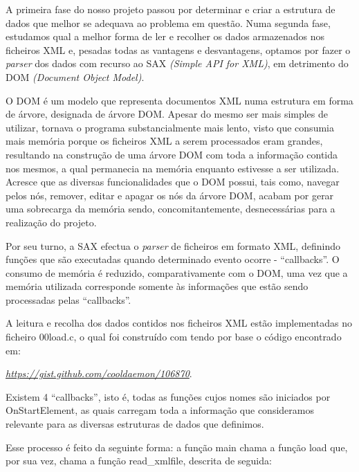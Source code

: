\documentclass[a4paper]{report}
\begin{document}
A primeira fase do nosso projeto passou por determinar e criar a estrutura de dados
que melhor se adequava ao problema em questão.
Numa segunda fase, estudamos qual a melhor forma de ler e recolher os dados armazenados
nos ficheiros XML e, pesadas todas as vantagens e desvantagens, optamos por fazer o
\textit{parser} dos dados com recurso ao SAX \textit{(Simple API for XML)},
em detrimento do DOM \textit{(Document Object Model)}. \par
O DOM é um modelo que representa documentos XML numa estrutura
em forma de árvore, designada de árvore DOM. Apesar do mesmo ser mais simples de utilizar,
tornava o programa substancialmente mais lento, visto que consumia mais memória porque os ficheiros
XML a serem processados eram grandes, resultando na construção de uma árvore DOM com toda a informação
contida nos mesmos, a qual permanecia na memória enquanto estivesse a ser utilizada. Acresce que
as diversas funcionalidades que o DOM possui, tais como, navegar pelos nós, remover, editar e apagar
os nós da árvore DOM, acabam por gerar uma sobrecarga da memória sendo, concomitantemente,
desnecessárias para a realização do projeto. \par
Por seu turno, a SAX efectua o \textit{parser} de ficheiros em formato XML, definindo
funções que são executadas quando determinado evento ocorre - ``callbacks''. O consumo de memória
é reduzido, comparativamente com o DOM, uma vez que a memória utilizada corresponde somente às
informações que estão sendo processadas pelas ``callbacks''. \par

A leitura e recolha dos dados contidos nos ficheiros XML estão implementadas no
ficheiro 00load.c, o qual foi construído com tendo por base o código encontrado em:
\begin{center}
\href{https://gist.github.com/cooldaemon/106870}{\emph{https://gist.github.com/cooldaemon/106870}}.
\end{center}

Existem 4 ``callbacks'', isto é, todas as funções cujos nomes são
iniciados por OnStartElement, as quais carregam toda a informação que consideramos
relevante para as diversas estruturas de dados que definimos. \par
Esse processo é feito da seguinte forma: a função main chama a função load que,
por sua vez, chama a função read\_xmlfile, descrita de seguida:
\end{document}

